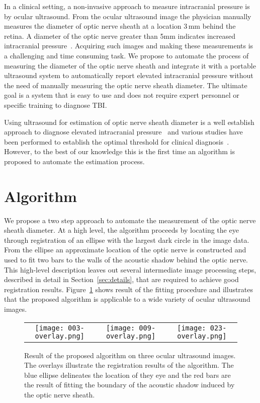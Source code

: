\documentclass{llncs}
\begin{document}
In a clinical setting, a non-invasive approach to measure intracranial pressure is
by ocular ultrasound. From the ocular ultrasound image the physician manually
measures the diameter of optic nerve sheath at a location 3\,mm behind the
retina. A diameter of the optic nerve greater than 5mm indicates increased
intracranial pressure~\cite{Ma2015}.  Acquiring such images and making these
measurements is a challenging and time consuming task. We propose to automate
the process of measuring the diameter of the optic nerve sheath and integrate
it with a portable ultrasound system to automatically report elevated
intracranial pressure without the need of manually measuring the optic nerve
sheath diameter. The ultimate goal is a system that is easy to use and does not
require expert personnel or specific training to diagnose TBI.    

Using ultrasound for estimation of optic nerve sheath diameter is a well
establish approach to diagnose elevated intracranial
pressure~\cite{Ki2008,Ro2011} and various studies have been performed to
establish the optimal threshold for clinical
diagnosis~\cite{Mo2009,Du2011,Ra2011}. However, to the best of our knowledge
this is the first time an algorithm is proposed to automate the estimation
process.

\section{Algorithm}
We propose a two step approach to automate the measurement of the optic nerve
sheath diameter. At a high level, the algorithm proceeds by locating the eye
through registration of an ellipse with the largest dark circle in the image
data. From the ellipse an approximate location of the optic nerve is constructed
and used to fit two bars to the walls of the acoustic shadow behind the optic
nerve. This high-level description leaves out several intermediate image
processing steps, described in detail in Section~\ref{sec:details}, that are
required to achieve good registration results.  Figure~\ref{fig:fitted} shows
result of the fitting procedure and illustrates that the proposed algorithm is
applicable to a wide variety of ocular ultrasound images.
\begin{figure}
\centering
\begin{tabular}{ccc}
\texttt{[image: 003-overlay.png]} &
\texttt{[image: 009-overlay.png]} &
\texttt{[image: 023-overlay.png]} 
\end{tabular}
\caption{
\label{fig:fitted}
Result of the proposed algorithm on three ocular ultrasound images. The
overlays illustrate the registration results of the algorithm. The blue ellipse
delineates the location of they eye and the red bars are the result of fitting
the boundary of the acoustic shadow induced by the optic nerve sheath.
}
\end{figure}
\end{document}
